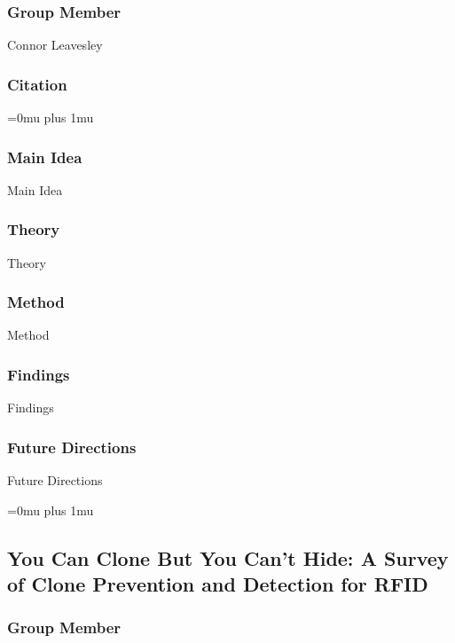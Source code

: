 \subsubsection{Group Member}

\noindent
Connor Leavesley

\noindent
\subsubsection{Citation}

\Urlmuskip=0mu plus 1mu\relax

\subsubsection{Main Idea}

\noindent
Main Idea

\subsubsection{Theory}

\noindent
Theory

\subsubsection{Method}

\noindent
Method

\subsubsection{Findings}

\noindent
Findings

\subsubsection{Future Directions}

\noindent
Future Directions 

\Urlmuskip=0mu plus 1mu\relax

\noindent
\subsection{{Y}ou {C}an {C}lone {B}ut {Y}ou {C}an't {H}ide: {A} {S}urvey of {C}lone {P}revention and {D}etection for {RFID}}

\subsubsection{Group Member}

